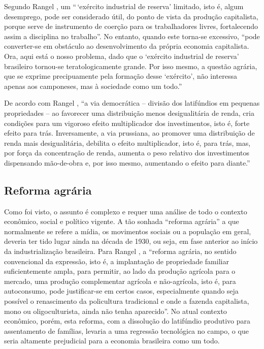 \documentclass[
	12pt,				%
	oneside,			%
	a4paper,			%
	chapter=TITLE,		%
	section=TITLE,		%
	english,			%
	brazil				%
	]{abntex2}
\begin{document}
\begin{refsection}
Segundo Rangel \autocite[142]{rangel1986c}, um ``\,`exército industrial de reserva'
limitado, isto é, algum desemprego, pode ser considerado útil, do ponto de vista
da produção capitalista, porque serve de instrumento de coerção para os
trabalhadores livres, fortalecendo assim a disciplina no trabalho''. No entanto,
quando este torna-se excessivo, ``pode converter-se em obstáculo ao
desenvolvimento da própria economia capitalista. Ora, aqui está o nosso
problema, dado que o `exército industrial de reserva' brasileiro tornou-se
teratologicamente grande. Por isso mesmo, a questão agrária, que se exprime
precipuamente pela formação desse `exército', não interessa apenas aos
camponeses, mas à sociedade como um todo.''

De acordo com Rangel \autocite*[156]{rangel1988}, ``a via democrática -- divisão dos
latifúndios em pequenas propriedades -- ao favorecer uma distribuição menos
desigualitária de renda, cria condições para um vigoroso efeito multiplicador
dos investimentos, isto é, forte efeito para trás. Inversamente, a via
prussiana, ao promover uma distribuição de renda mais desigualitária, debilita o
efeito multiplicador, isto é, para trás, mas, por força da concentração de
renda, aumenta o peso relativo dos investimentos dispensando mão-de-obra e, por
isso mesmo, aumentando o efeito para diante.''

\hypertarget{reforma-agruxe1ria}{%
\subsection{Reforma agrária}\label{reforma-agruxe1ria}}

Como foi visto, o assunto é complexo e requer uma análise de todo o contexto
econômico, social e político vigente. A tão sonhada ``reforma agrária'' a que
normalmente se refere a mídia, os movimentos sociais ou a população em geral,
deveria ter tido lugar ainda na década de 1930, ou seja, em fase anterior ao
início da industrialização brasileira. Para Rangel \autocite[154]{rangel1986a}, a
``reforma agrária, no sentido convencional da expressão, isto é, a implantação de
propriedade familiar suficientemente ampla, para permitir, ao lado da produção
agrícola para o mercado, uma produção complementar agrícola e não-agrícola, isto
é, para autoconsumo, pode justificar-se em certos casos, especialmente quando
seja possível o renascimento da policultura tradicional e onde a fazenda
capitalista, mono ou oligoculturista, ainda não tenha aparecido''. No atual
contexto econômico, porém, esta reforma, com a dissolução do latifúndio
produtivo para assentamento de famílias, levaria a uma regressão tecnológica no
campo, o que seria altamente prejudicial para a economia brasileira como um
todo.


\end{refsection}
\end{document}
